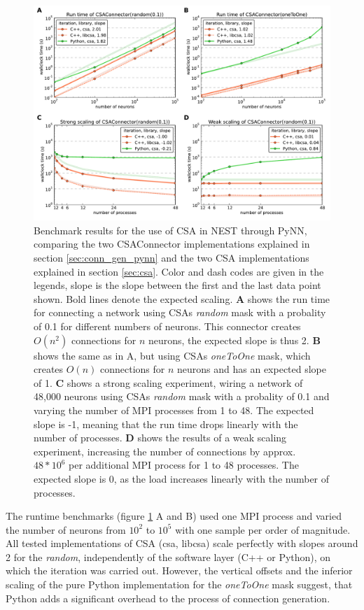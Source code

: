 \documentclass{frontiersSCNS} %
\begin{document}
\begin{figure}[ht]
\centering
\includegraphics[scale=.7]{benchmarks/CSAConnector/CSAConnector.pdf}
\caption{Benchmark results for the use of CSA in NEST through PyNN,
  comparing the two CSAConnector implementations explained in section
  \ref{sec:conn_gen_pynn} and the two CSA implementations explained in
  section \ref{sec:csa}. Color and dash codes are given in the
  legends, slope is the slope between the first and the last data
  point shown. Bold lines denote the expected scaling. \textbf{A}
  shows the run time for connecting a network using CSAs \emph{random}
  mask with a probality of 0.1 for different numbers of neurons. This
  connector creates $O(n^2)$ connections for $n$ neurons, the expected
  slope is thus 2. \textbf{B} shows the same as in A, but using CSAs
  \emph{oneToOne} mask, which creates $O(n)$ connections for $n$
  neurons and has an expected slope of 1. \textbf{C} shows a strong
  scaling experiment, wiring a network of 48,000 neurons using CSAs
  \emph{random} mask with a probality of 0.1 and varying the number of
  MPI processes from 1 to 48. The expected slope is -1, meaning that
  the run time drops linearly with the number of processes. \textbf{D}
  shows the results of a weak scaling experiment, increasing the
  number of connections by approx. $48*10^6$ per additional MPI
  process for 1 to 48 processes. The expected slope is 0, as the load
  increases linearly with the number of
  processes.}\label{fig:pynn_benchmarks}
\end{figure}

The runtime benchmarks (figure \ref{fig:pynn_benchmarks} A and B) used
one MPI process and varied the number of neurons from $10^2$ to $10^5$
with one sample per order of magnitude. All tested implementations of
CSA (csa, libcsa) scale perfectly with slopes around 2 for the
\emph{random}, independently of the software layer (C++ or Python), on
which the iteration was carried out. However, the vertical offsets and
the inferior scaling of the pure Python implementation for the
\emph{oneToOne} mask suggest, that Python adds a significant overhead
to the process of connection generation.
\end{document}
